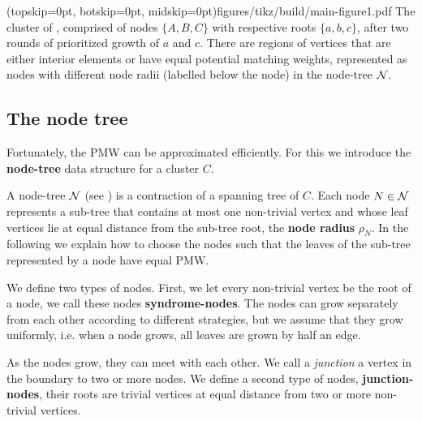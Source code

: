 \Figure[bt](topskip=0pt, botskip=0pt, midskip=0pt){figures/tikz/build/main-figure1.pdf}{
    The cluster of , comprised of nodes $\{A, B, C\}$ with respective roots $\{a, b, c\}$, after two rounds of prioritized growth of $a$ and $c$. There are regions of vertices that are either interior elements or have equal potential matching weights, represented as nodes with different node radii (labelled below the node) in the node-tree $\mathcal{N}$. \label{fig:pmw}}

\subsection{The node tree}\label{sec:nodeset}
Fortunately, the PMW can be approximated efficiently. 
For this we introduce the \textbf{node-tree} data structure for a cluster $C$. 

A node-tree $\mathcal{N}$ (see ) is a contraction of a spanning tree of $C$. Each node $N\in\mathcal{N}$ represents a sub-tree that contains at most one non-trivial vertex and whose leaf vertices lie at equal distance from the sub-tree root, the \textbf{node radius} $\rho_N$. In the following we explain how to choose the nodes such that the leaves of the sub-tree represented by a node have equal PMW.

We define two types of nodes. First, we let every non-trivial vertex be the root of a node, we call these nodes \textbf{syndrome-nodes}. The nodes can grow separately from each other according to different strategies, but we assume that they grow uniformly, i.e. when a node grows, all leaves are grown by half an edge.

As the nodes grow, they can meet with each other. We call a \emph{junction} a vertex in the boundary to two or more nodes. We define a second type of nodes, \textbf{junction-nodes}, their roots are trivial vertices at equal distance from two or more non-trivial vertices.


